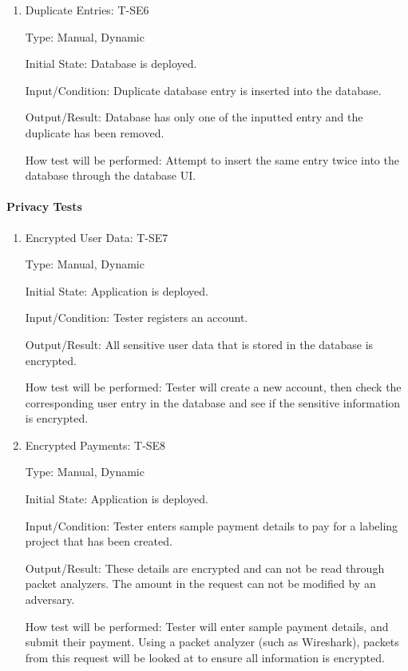 \documentclass[12pt, titlepage]{article}
\begin{document}
\begin{enumerate}

\item{Duplicate Entries: T-SE6\\}

Type: Manual, Dynamic
					
Initial State: Database is deployed.
					
Input/Condition: Duplicate database entry is inserted into the database.
					
Output/Result: Database has only one of the inputted entry and the duplicate has been removed.
					
How test will be performed: Attempt to insert the same entry twice into the database through the database UI.

\end{enumerate}

\paragraph{Privacy Tests}

\begin{enumerate}

\item{Encrypted User Data: T-SE7\\}

Type: Manual, Dynamic
					
Initial State: Application is deployed.
					
Input/Condition: Tester registers an account.
					
Output/Result: All sensitive user data that is stored in the database is encrypted.
					
How test will be performed: Tester will create a new account, then check the corresponding user entry in the database and see if the sensitive information is encrypted.

\item{Encrypted Payments: T-SE8\\}

Type: Manual, Dynamic
					
Initial State: Application is deployed.
					
Input/Condition: Tester enters sample payment details to pay for a labeling project that has been created.
					
Output/Result: These details are encrypted and can not be read through packet analyzers. The amount in the request can not be modified by an adversary.
					
How test will be performed: Tester will enter sample payment details, and submit their payment. Using a packet analyzer (such as Wireshark), packets from this request will be looked at to ensure all information is encrypted.

\end{enumerate}
\end{document}
